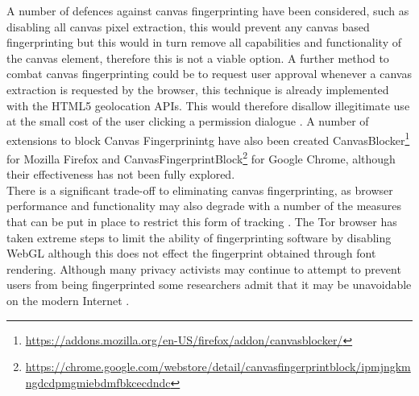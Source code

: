 \documentclass[12pt]{article}
\begin{document}
A number of defences against canvas fingerprinting have been considered, such as disabling all canvas pixel extraction, this would prevent any canvas based fingerprinting but this would in turn remove all capabilities and functionality of the canvas element, therefore this is not a viable option. A further method to combat canvas fingerprinting could be to request user approval whenever a canvas extraction is requested by the browser, this technique is already implemented with the HTML5 geolocation APIs. This would therefore disallow illegitimate use at the small cost of the user clicking a permission dialogue \parencite{canvasFP}. A number of extensions to block Canvas Fingerprinintg have also been created CanvasBlocker\footnote{\url{https://addons.mozilla.org/en-US/firefox/addon/canvasblocker/}} for Mozilla Firefox and CanvasFingerprintBlock\footnote{\url{https://chrome.google.com/webstore/detail/canvasfingerprintblock/ipmjngkmngdcdpmgmiebdmfbkcecdndc}} for Google Chrome, although their effectiveness has not been fully explored. \\  

There is a significant trade-off to eliminating canvas fingerprinting, as browser performance and functionality may also degrade with a number of the measures that can be put in place to restrict this form of tracking \parencite{canvasFP}. The Tor browser has taken extreme steps to limit the ability of fingerprinting software by disabling WebGL although this does not effect the fingerprint obtained through font rendering. Although many privacy activists may continue to attempt to prevent users from being fingerprinted some researchers admit that it may be unavoidable on the modern Internet \parencite{canvasFP}.

\end{document}
